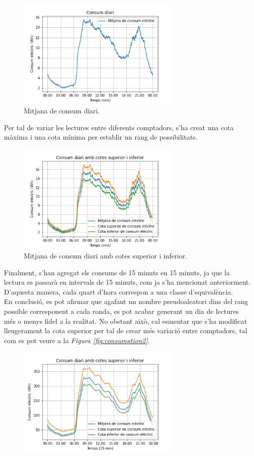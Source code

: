 \begin{itemize}
\begin{figure}[H]
	\centering
	\includegraphics[width=8cm]{imgs/cost/consumptionmin.png}
	\caption{Mitjana de consum diari.}
	\label{fig:consumptionmin1}
\end{figure}
Per tal de variar les lectures entre diferents comptadors, s'ha creat una cota màxima i una cota mínima per establir un rang de possibilitats.
\begin{figure}[H]
	\centering
	\includegraphics[width=8cm]{imgs/cost/consumptionmin2.png}
	\caption{Mitjana de consum diari amb cotes superior i inferior.}
	\label{fig:consumptionmin2}
\end{figure}
Finalment,  s'han agregat els consums de 15 minuts en 15 minuts, ja que la lectura es passarà en intervals de 15 minuts, com ja s'ha mencionat anteriorment. D'aquesta manera, cada quart d'hora correspon a una classe d'equivalència. \\
En conclusió, es pot afirmar que agafant un nombre pseudoaleatori dins del rang possible corresponent a cada ronda, es pot acabar generant un dia de lectures més o menys fidel a la realitat. No obstant això, cal esmentar que s'ha modificat lleugerament la cota superior per tal de crear més variació entre comptadors, tal com es pot veure a la \textit{Figura \ref{fig:consumption2}}.
\begin{figure}[H]
	\centering
	\includegraphics[width=8cm]{imgs/cost/consumption2.png}

\end{figure}
\end{itemize}
